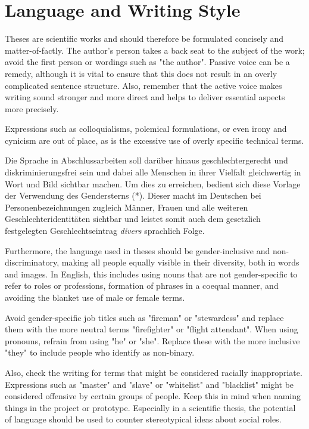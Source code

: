 \section{Language and Writing Style}

Theses are scientific works and should therefore be formulated concisely and
matter-of-factly. The author's person takes a back seat to the subject of the
work; avoid the first person or wordings such as "the author". Passive voice can
be a remedy, although it is vital to ensure that this does not result in an
overly complicated sentence structure. Also, remember that the active voice
makes writing sound stronger and more direct and helps to deliver essential
aspects more precisely.

Expressions such as colloquialisms, polemical formulations, or even irony and
cynicism are out of place, as is the excessive use of overly specific technical
terms.

Die Sprache in Abschlussarbeiten soll darüber hinaus geschlechtergerecht und
diskriminierungsfrei sein und dabei alle Menschen in ihrer Vielfalt gleichwertig
in Wort und Bild sichtbar machen. Um dies zu erreichen, bedient sich diese
Vorlage der Verwendung des Gendersterns (*). Dieser macht im Deutschen bei
Personenbezeichnungen zugleich Männer, Frauen und alle weiteren
Geschlechteridentitäten sichtbar und leistet somit auch dem gesetzlich
festgelegten Geschlechtseintrag \emph{divers} sprachlich Folge.

Furthermore, the language used in theses should be gender-inclusive and
non-discri\-minatory, making all people equally visible in their diversity,
both in words and images. In English, this includes using nouns that are not
gender-specific to refer to roles or professions, formation of phrases in a
coequal manner, and avoiding the blanket use of male or female terms.

Avoid gender-specific job titles such as "fireman" or "stewardess" and replace
them with the more neutral terms "firefighter" or "flight attendant". When
using pronouns, refrain from using "he" or "she". Replace these with the more
inclusive "they" to include people who identify as non-binary.

Also, check the writing for terms that might be considered racially
inappropriate. Expressions such as "master" and "slave" or "whitelist" and
"blacklist" might be considered offensive by certain groups of people. Keep this
in mind when naming things in the project or prototype. Especially in a
scientific thesis, the potential of language should be used to counter
stereotypical ideas about social roles.


